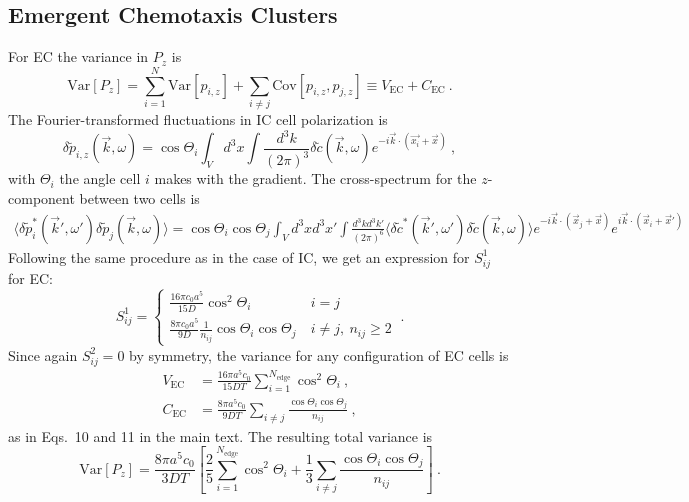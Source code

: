 \subsection{Emergent Chemotaxis Clusters}
For EC the variance in $P_z$ is
\begin{equation}
    \text{Var}[P_z] = \sum_{i=1}^N \text{Var}[p_{i,z}] + \sum_{i\neq j} \text{Cov}[p_{i,z},p_{j,z}] \equiv V_\text{EC} + C_\text{EC} \ .
\end{equation}
The Fourier-transformed fluctuations in IC cell polarization is
\begin{equation}
    \delta\tilde{p}_{i,z}(\vec{k},\omega) = \cos\Theta_i \int_V d^3x \int \frac{d^3k}{(2\pi)^3}
    \delta\tilde{c}(\vec{k},\omega)
    e^{-i\vec{k}\cdot(\vec{x_i}+\vec{x})} \ ,
\end{equation}
with $\Theta_i$ the angle cell $i$ makes with the gradient.
The cross-spectrum for the $z$-component between two cells is
\begin{equation} \label{eq:pijEC1}
\begin{split}
    \langle\delta\tilde{p}_i^*(\vec{k}',\omega')\delta\tilde{p}_j(\vec{k},\omega) \rangle = \cos\Theta_i \cos\Theta_j \int_V d^3x d^3x' \int \frac{d^3kd^3k'}{(2\pi)^6}
    \langle \delta\tilde{c}^*(\vec{k}',\omega')\delta\tilde{c}(\vec{k},\omega) \rangle
    e^{-i\vec{k}\cdot(\vec{x}_j+\vec{x})} e^{i\vec{k}\cdot(\vec{x}_i+\vec{x}')}
\end{split}
\end{equation}
Following the same procedure as in the case of IC, we get an expression for $S_{ij}^1$ for EC:
\begin{equation} \label{eq:SijEC1}
    S_{ij}^1 =
    \begin{cases}
        \frac{16\pi c_0a^5}{15D} \cos^2\Theta_i &\ i=j \\
        \frac{8\pi c_0a^5}{9D} \frac{1}{n_{ij}} \cos\Theta_i \cos\Theta_j &\ i \neq j, \ n_{ij} \geq 2
    \end{cases} \ .
\end{equation}
Since again $S^2_{ij}=0$ by symmetry, the variance for any configuration of EC cells is
\begin{align}
    V_\text{EC} &= \frac{16\pi a^5c_0}{15DT} \sum_{i=1}^{N_\text{edge}} \cos^2\Theta_i \ , \label{eq:ECV1} \\
    C_\text{EC} &= \frac{8\pi a^5c_0}{9DT} \sum_{i\neq j} \frac{\cos\Theta_i \cos\Theta_j}{n_{ij}} \ , \label{eq:ECC1}
\end{align}
as in Eqs.\ 10 and 11 in the main text. The resulting total variance is
\begin{equation} \label{eq:ECvarP}
    \text{Var}[P_z] = \frac{8\pi a^5c_0}{3DT} \left[ \frac{2}{5} \sum_{i=1}^{N_\text{edge}} \cos^2\Theta_i +  \frac{1}{3} \sum_{i\neq j} \frac{\cos\Theta_i \cos\Theta_j}{n_{ij}} \right] \ .
\end{equation}


